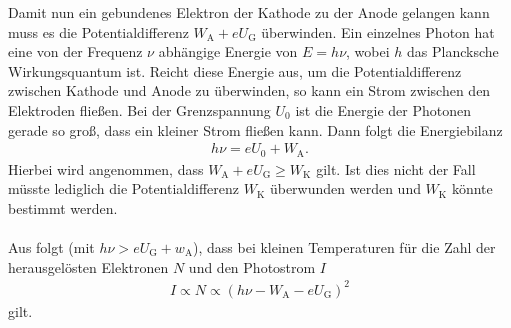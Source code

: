 Damit nun ein gebundenes Elektron der Kathode zu der Anode gelangen kann muss es die Potentialdifferenz $W_\mathrm{A}+eU_\mathrm{G}$ überwinden. Ein einzelnes Photon hat eine von der Frequenz $\nu$ abhängige Energie von $E=h\nu$, wobei $h$ das Plancksche Wirkungsquantum ist. Reicht diese Energie aus, um die Potentialdifferenz zwischen Kathode und Anode zu überwinden, so kann ein Strom zwischen den Elektroden fließen. Bei der Grenzspannung $U_0$ ist die Energie der Photonen gerade so groß, dass ein kleiner Strom fließen kann. Dann folgt die Energiebilanz
\begin{align}
  h\nu=eU_0+W_\mathrm{A}.
  \label{eqn:grenzspannung}	
\end{align}
Hierbei wird angenommen, dass $W_\mathrm{A}+eU_\mathrm{G} \geq W_\mathrm{K}$ gilt. Ist dies nicht der Fall müsste lediglich die Potentialdifferenz $W_\mathrm{K}$ überwunden werden und $W_\mathrm{K}$ könnte bestimmt werden. \\ \\
Aus \cite{kennlinie} folgt (mit $h\nu>eU_\mathrm{G}+w_\mathrm{A}$), dass bei kleinen Temperaturen für die Zahl der herausgelösten Elektronen $N$ und den Photostrom $I$
\begin{align}
  I \propto N \propto \left(  h\nu-W_\mathrm{A}-eU_\mathrm{G}\right)^2
\end{align} 
gilt. 